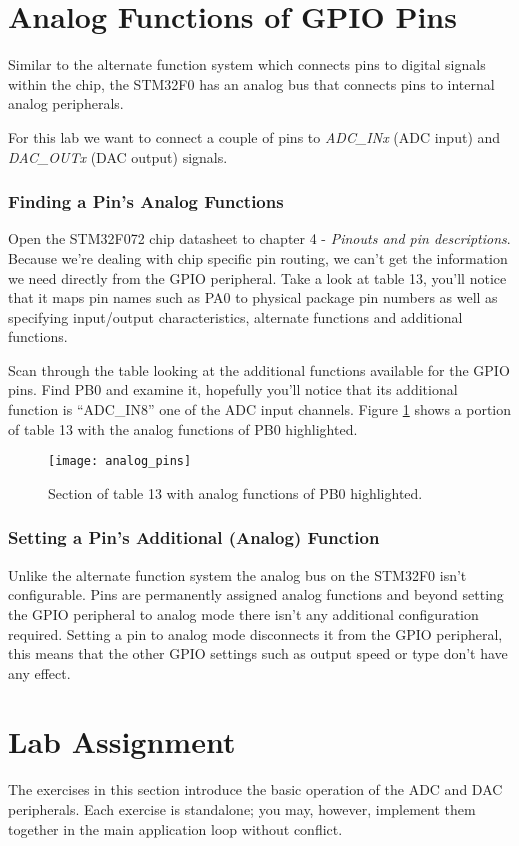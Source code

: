 \documentclass[openany,11pt,fleqn]{book} %
\begin{document}
\section{Analog Functions of GPIO Pins}
Similar to the alternate function system which connects pins to digital signals within the chip, the STM32F0 has an analog bus that connects pins to internal analog peripherals. 

For this lab we want to connect a couple of pins to \textit{ADC\_INx} (ADC input) and \textit{DAC\_OUTx} (DAC output) signals. 

\subsubsection{Finding a Pin's Analog Functions}
Open the STM32F072 chip datasheet to chapter 4 - \textit{Pinouts and pin descriptions}. Because we're dealing with chip specific pin routing, we can't get the information we need directly from the GPIO peripheral. Take a look at table 13, you'll notice that it maps pin names such as PA0 to physical package pin numbers as well as specifying input/output characteristics, alternate functions and additional functions.

Scan through the table looking at the additional functions available for the GPIO pins. Find PB0 and examine it, hopefully you'll notice that its additional function is ``ADC\_IN8'' one of the ADC input channels. Figure \ref{analog_pins} shows a portion of table 13 with the analog functions of PB0 highlighted.

\begin{figure}[]
    \centering\texttt{[image: analog\_pins]}
    \caption{Section of table 13 with analog functions of PB0 highlighted.}
    \label{analog_pins}
\end{figure}

\subsubsection{Setting a Pin's Additional (Analog) Function}
Unlike the alternate function system the analog bus on the STM32F0 isn't configurable. Pins are permanently assigned analog functions and beyond setting the GPIO peripheral to analog mode there isn't any additional configuration required. Setting a pin to analog mode disconnects it from the GPIO peripheral, this means that the other GPIO settings such as output speed or type don't have any effect.

\section{\color{blue}Lab Assignment}
The exercises in this section introduce the basic operation of the ADC and DAC peripherals. Each exercise is standalone; you may, however, implement them together in the main application loop without conflict. 
\end{document}
